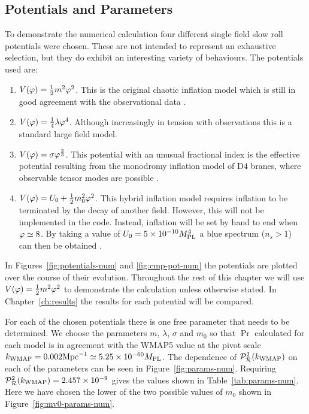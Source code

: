 \subsection{Potentials and Parameters}
\label{sec:pots-num}
To demonstrate the numerical calculation four different single field slow roll
potentials were chosen. These are not intended to represent an exhaustive selection,
but they do exhibit an interesting variety of behaviours. The potentials used are:
% 
% 
\begin{enumerate}
% 
 \item $V(\varphi) = \frac{1}{2} m^2 \varphi^2$. This is the original chaotic inflation model which is
still in good agreement with the observational data \cite{Alabidi:2008ej}.
% 
 \item $V(\varphi) = \frac{1}{4}\lambda\varphi^4$. Although increasingly in tension with observations
 this is a standard large field model.
% 
 \item $V(\varphi) = \sigma\varphi^{\frac{2}{3}}$. This potential with an unusual fractional index
is the effective potential resulting from the monodromy inflation model of D$4$
branes, where observable tensor modes are possible \cite{Silverstein:2008sg,
Alabidi:2008ej}.
% 
 \item $V(\varphi) = U_0 + \frac{1}{2} m_0^2 \varphi^2$. This hybrid inflation model requires inflation to
be terminated by the decay of another field. However, this will not be
implemented in the code. Instead,
inflation will be set by hand to end when $\varphi \simeq 8$. By taking a value of
$U_0 = 5\times 10^{-10}M_{\mathrm{PL}}^{4}$ a blue spectrum ($n_s>1$) can then be obtained
\cite{Linde:1993cn,Komatsu:2008hk}.
% 
\end{enumerate}
% 
% 
In Figures~\ref{fig:potentials-num} and \ref{fig:cmp-pot-num} the potentials are
plotted over the course of their evolution. Throughout the rest of this
chapter we will use $V(\varphi)=\frac{1}{2} m^2 \varphi^2$ to
demonstrate the calculation unless otherwise stated. In Chapter~\ref{ch:results} the
results for each potential will be compared.

For each of the chosen potentials there is one free parameter that needs to be
determined.
We choose the parameters $m$, $\lambda$, $\sigma$ and $m_0$ so that $\Pr$ calculated
for each model is in agreement with the
WMAP5 value at the pivot scale
$k_\mathrm{WMAP}=0.002\mathrm{Mpc}^{-1} \simeq5.25\times10^{- 60} M_{\mathrm{PL}}$. 
The dependence of $\mathcal{P}_{\mathcal{R}}^2 (k_\mathrm{WMAP})$ on each of the parameters can be seen in
Figure~\ref{fig:params-num}.
Requiring $\mathcal{P}_{\mathcal{R}}^2 (k_\mathrm{WMAP})=2.457\times 10^{-9}$
gives the values shown in Table~\ref{tab:params-num}. Here we have chosen the lower
of the two possible values of $m_0$ shown in Figure~\ref{fig:mv0-params-num}.

